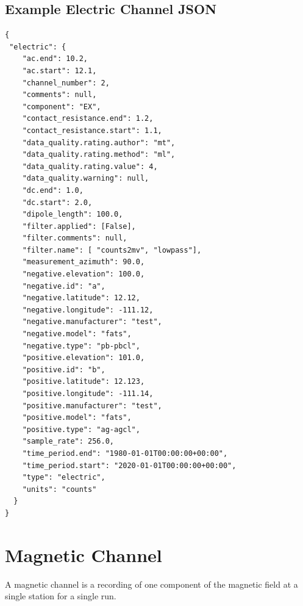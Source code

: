 \documentclass[12pt]{article}
\begin{document}
\clearpage
\newpage
\subsection{Example Electric Channel JSON}

\begin{verbatim}
{
 "electric": {
    "ac.end": 10.2,
    "ac.start": 12.1,
    "channel_number": 2,
    "comments": null,
    "component": "EX",
    "contact_resistance.end": 1.2,
    "contact_resistance.start": 1.1,
    "data_quality.rating.author": "mt",
    "data_quality.rating.method": "ml",
    "data_quality.rating.value": 4,
    "data_quality.warning": null,
    "dc.end": 1.0,
    "dc.start": 2.0,
    "dipole_length": 100.0,
    "filter.applied": [False],
    "filter.comments": null,
    "filter.name": [ "counts2mv", "lowpass"],
    "measurement_azimuth": 90.0,
    "negative.elevation": 100.0,
    "negative.id": "a",
    "negative.latitude": 12.12,
    "negative.longitude": -111.12,
    "negative.manufacturer": "test",
    "negative.model": "fats",
    "negative.type": "pb-pbcl",
    "positive.elevation": 101.0,
    "positive.id": "b",
    "positive.latitude": 12.123,
    "positive.longitude": -111.14,
    "positive.manufacturer": "test",
    "positive.model": "fats",
    "positive.type": "ag-agcl",
    "sample_rate": 256.0,
    "time_period.end": "1980-01-01T00:00:00+00:00",
    "time_period.start": "2020-01-01T00:00:00+00:00",
    "type": "electric",
    "units": "counts"
  }
}
\end{verbatim}

\clearpage
\newpage
\section{Magnetic Channel}

A magnetic channel is a recording of one component of the magnetic field at a single station for a single run.
\end{document}
